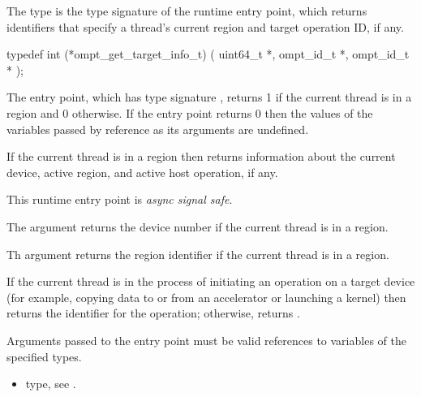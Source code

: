 \summary
The  type is the type signature of the 
 runtime entry point, which returns identifiers 
that specify a thread's current  region and target operation ID, if any.

\format
\begin{ccppspecific}
\begin{omptInquiry}
typedef int (*ompt_get_target_info_t) (
  uint64_t *,
  ompt_id_t *,
  ompt_id_t *
);
\end{omptInquiry}
\end{ccppspecific}

\descr
The  entry point, which has type signature 
, returns 1 if the current thread is in a 
 region and 0 otherwise. If the entry point returns 0 then
the values of the variables passed by reference as its arguments are undefined.

If the current thread is in a  region then 
returns information about the current device, active  region, and
active host operation, if any.

This runtime entry point is \emph{async signal safe}.

\argdesc
The  argument returns the device number if the current 
thread is in a  region.

Th  argument returns the  region identifier 
if the current thread is in a  region.

If the current thread is in the process of initiating an operation on a 
target device (for example, copying data to or from an accelerator or 
launching a kernel) then  returns the identifier for the 
operation; otherwise,  returns .

\constraints
Arguments passed to the entry point must be valid references to variables 
of the specified types.

\crossreferences
\begin{itemize}
\item {} type, see .
\end{itemize}



\subsubsection{}
\label{sec:ompt_get_num_devices_t}
\label{sec:ompt_get_num_devices}

